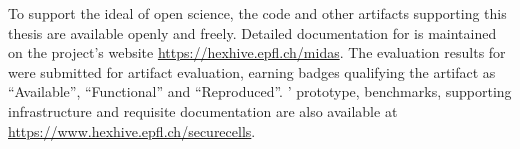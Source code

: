 To support the ideal of open science, the code and other artifacts
supporting this thesis are available openly and freely.
Detailed documentation for \midas is maintained on the project's website
\url{https://hexhive.epfl.ch/midas}.
The evaluation results for \midas were submitted for artifact evaluation,
earning badges qualifying the artifact as ``Available'', ``Functional''
and ``Reproduced''.
\seccells{}' prototype, benchmarks, supporting infrastructure and
requisite documentation are also available at 
\url{https://www.hexhive.epfl.ch/securecells}.


